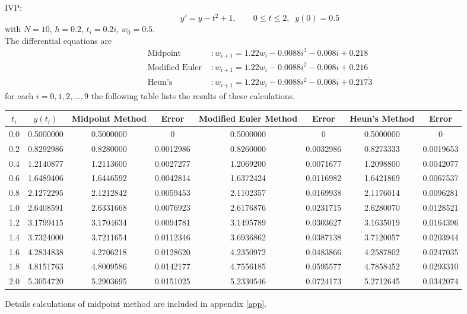 \documentclass[../main-sheet.tex]{subfiles}
\begin{document}
\begin{ex}
    IVP:
    \[
        y'=y-t^2+1,\qquad 0\leq t\leq 2,\;\;y(0)=0.5
    \]
    with \(N=10\), \(h=0.2\), \(t_i=0.2i\), \(w_0=0.5\).\\
    The differential equations are
    \begin{align*}
        \text{Midpoint }&: w_{i+1}=1.22w_i-0.0088i^2-0.008i+0.218\\
        \text{Modified Euler }&: w_{i+1}=1.22w_i-0.0088i^2-0.008i+0.216\\
        \text{Heun's }&: w_{i+1}=1.22w_i-0.0088i^2-0.008i+0.217\dot{3}
    \end{align*}
    for each \(i=0,1,2,\dots,9\) the following table lists the results of these calculations.
    \begin{table}[H]
        \centering
        \begin{tabular}{cccc@{}c@{}ccc}
            \toprule
            \(t_i\) & \(y(t_i)\) & Midpoint Method & Error & {Modified Euler Method} & Error& Heun's Method & Error\\\midrule
            0.0 & 0.5000000 & 0.5000000 & 0 & 0.5000000 & 0 & 0.5000000 & 0\\
            0.2 & 0.8292986 & 0.8280000 & 0.0012986 & 0.8260000 & 0.0032986 & 0.8273333 & 0.0019653\\
            0.4 & 1.2140877 & 1.2113600 & 0.0027277 & 1.2069200 & 0.0071677 & 1.2098800 & 0.0042077\\
            0.6 & 1.6489406 & 1.6446592 & 0.0042814 & 1.6372424 & 0.0116982 & 1.6421869 & 0.0067537\\
            0.8 & 2.1272295 & 2.1212842 & 0.0059453 & 2.1102357 & 0.0169938 & 2.1176014 & 0.0096281\\
            1.0 & 2.6408591 & 2.6331668 & 0.0076923 & 2.6176876 & 0.0231715 & 2.6280070 & 0.0128521\\
            1.2 & 3.1799415 & 3.1704634 & 0.0094781 & 3.1495789 & 0.0303627 & 3.1635019 & 0.0164396\\
            1.4 & 3.7324000 & 3.7211654 & 0.0112346 & 3.6936862 & 0.0387138 & 3.7120057 & 0.0203944\\
            1.6 & 4.2834838 & 4.2706218 & 0.0128620 & 4.2350972 & 0.0483866 & 4.2587802 & 0.0247035\\
            1.8 & 4.8151763 & 4.8009586 & 0.0142177 & 4.7556185 & 0.0595577 & 4.7858452 & 0.0293310\\
            2.0 & 5.3054720 & 5.2903695 & 0.0151025 & 5.2330546 & 0.0724173 & 5.2712645 & 0.0342074\\
            \bottomrule
        \end{tabular}
    \end{table}
    \begin{note}
        Details calculations of midpoint method are included in appendix \ref{app}.
    \end{note}
\end{ex}
\end{document}

